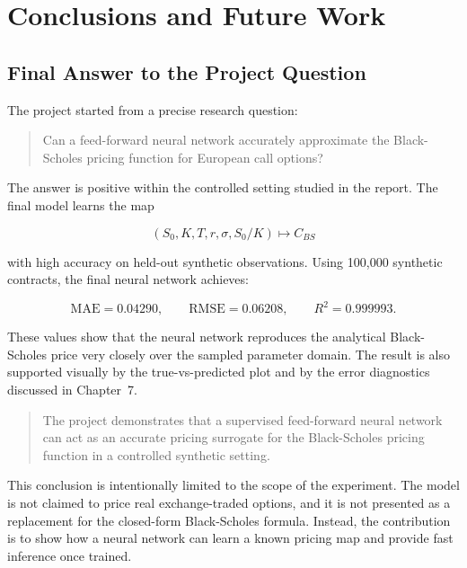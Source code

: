 \chapter{Conclusions and Future Work}

\section{Final Answer to the Project Question}

The project started from a precise research question:

\begin{quote}
    Can a feed-forward neural network accurately approximate the Black-Scholes pricing function for European call options?
\end{quote}

The answer is positive within the controlled setting studied in the report.
The final model learns the map

\begin{equation}
    (S_0, K, T, r, \sigma, S_0/K)
    \longmapsto
    C_{BS}
\end{equation}

with high accuracy on held-out synthetic observations.
Using 100,000 synthetic contracts, the final neural network achieves:

\begin{equation}
    \mathrm{MAE}=0.04290,
    \qquad
    \mathrm{RMSE}=0.06208,
    \qquad
    R^2=0.999993.
\end{equation}

These values show that the neural network reproduces the analytical Black-Scholes price very closely over the sampled parameter domain.
The result is also supported visually by the true-vs-predicted plot and by the error diagnostics discussed in Chapter~7.

\begin{quote}
    The project demonstrates that a supervised feed-forward neural network can act as an accurate pricing surrogate for the Black-Scholes pricing function in a controlled synthetic setting.
\end{quote}

This conclusion is intentionally limited to the scope of the experiment.
The model is not claimed to price real exchange-traded options, and it is not presented as a replacement for the closed-form Black-Scholes formula.
Instead, the contribution is to show how a neural network can learn a known pricing map and provide fast inference once trained.

